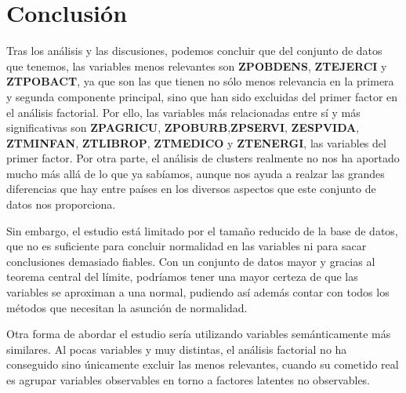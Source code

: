 \documentclass[letterpaper,11pt]{article}
\begin{document}
\section{Conclusión}

Tras los análisis y las discusiones, podemos concluir que del conjunto de datos que tenemos, las variables menos relevantes son \textbf{ZPOBDENS}, \textbf{ZTEJERCI} y \textbf{ZTPOBACT}, ya que son las que tienen no sólo menos relevancia en la primera y segunda componente principal, sino que han sido excluidas del primer factor en el análisis factorial. Por ello, las variables más relacionadas entre sí y más significativas son \textbf{ZPAGRICU}, \textbf{ZPOBURB},\textbf{ZPSERVI}, \textbf{ZESPVIDA}, \textbf{ZTMINFAN}, \textbf{ZTLIBROP}, \textbf{ZTMEDICO} y \textbf{ZTENERGI}, las variables del primer factor. Por otra parte, el análisis de clusters realmente no nos ha aportado mucho más allá de lo que ya sabíamos, aunque nos ayuda a realzar las grandes diferencias que hay entre países en los diversos aspectos que este conjunto de datos nos proporciona.

Sin embargo, el estudio está limitado por el tamaño reducido de la base de datos, que no es suficiente para concluir normalidad en las variables ni para sacar conclusiones demasiado fiables. Con un conjunto de datos mayor y gracias al teorema central del límite, podríamos tener una mayor certeza de que las variables se aproximan a una normal, pudiendo así además contar con todos los métodos que necesitan la asunción de normalidad.

Otra forma de abordar el estudio sería utilizando variables semánticamente más similares. Al pocas variables y muy distintas, el análisis factorial no ha conseguido sino únicamente excluir las menos relevantes, cuando su cometido real es agrupar variables observables en torno a factores latentes no observables.
\end{document}
